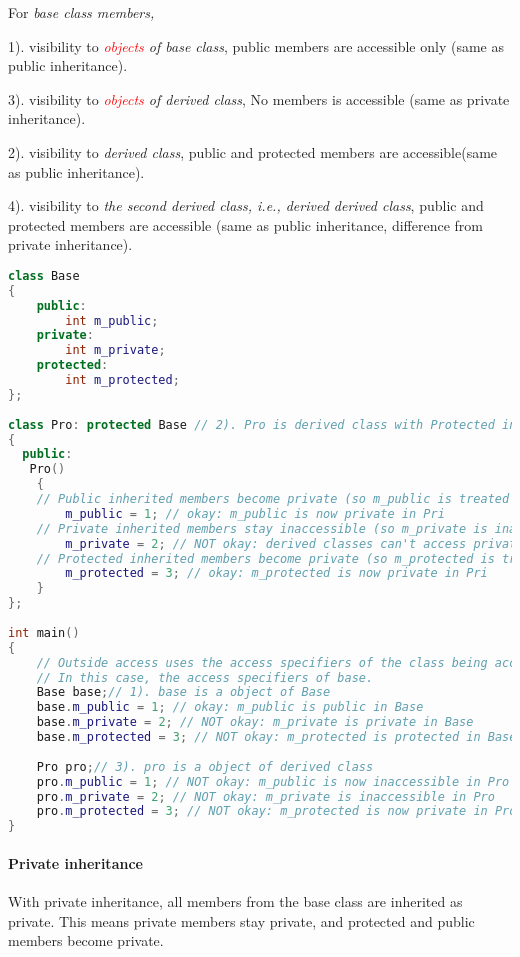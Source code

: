 \documentclass{book}
\begin{document}
For \textit{base class members,}

1). visibility to \textit{\textcolor{red}{objects} of base class}, public members are accessible only (same as public inheritance).

3). visibility to \textit{\textcolor{red}{objects} of derived class}, No members is accessible (same as private inheritance).

2). visibility to \textit{derived class}, public and protected members are accessible(same as public inheritance).

4). visibility to \textit{the second derived class, i.e., derived derived class}, public and protected members are accessible (same as public inheritance, difference from private inheritance).
\begin{lstlisting}[caption={Protected inheritance exmaple}, language=C++]
class Base
{
    public:
        int m_public;
    private:
        int m_private;
    protected:
        int m_protected;
};
 
class Pro: protected Base // 2). Pro is derived class with Protected inheritance
{
  public:
   Pro()
    {
    // Public inherited members become private (so m_public is treated as private)
        m_public = 1; // okay: m_public is now private in Pri
    // Private inherited members stay inaccessible (so m_private is inaccessible)
        m_private = 2; // NOT okay: derived classes can't access private members in the base class
    // Protected inherited members become private (so m_protected is treated as private)
        m_protected = 3; // okay: m_protected is now private in Pri
    }
};
 
int main()
{
    // Outside access uses the access specifiers of the class being accessed.
    // In this case, the access specifiers of base.
    Base base;// 1). base is a object of Base
    base.m_public = 1; // okay: m_public is public in Base
    base.m_private = 2; // NOT okay: m_private is private in Base
    base.m_protected = 3; // NOT okay: m_protected is protected in Base
 
    Pro pro;// 3). pro is a object of derived class
    pro.m_public = 1; // NOT okay: m_public is now inaccessible in Pro
    pro.m_private = 2; // NOT okay: m_private is inaccessible in Pro
    pro.m_protected = 3; // NOT okay: m_protected is now private in Pro
}
\end{lstlisting}

\paragraph{Private inheritance}
With private inheritance, all members from the base class are inherited as private. This means private members stay private, and protected and public members become private.
\end{document}
